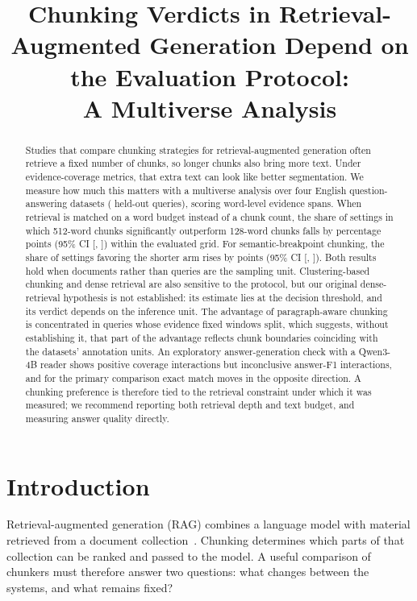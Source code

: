 \documentclass[11pt]{article}
\title{Chunking Verdicts in Retrieval-Augmented Generation Depend on the Evaluation Protocol:\texorpdfstring{\\}{ }A Multiverse Analysis}
\author{\AuthorName}
\date{}
\begin{document}
\maketitle

\begin{abstract}
Studies that compare chunking strategies for retrieval-augmented generation often retrieve a fixed number of chunks, so longer chunks also bring more text. Under evidence-coverage metrics, that extra text can look like better segmentation. We measure how much this matters with a multiverse analysis over four English question-answering datasets (\EoneNq{} held-out queries), scoring word-level evidence spans. When retrieval is matched on a word budget instead of a chunk count, the share of settings in which 512-word chunks significantly outperform 128-word chunks falls by \HOneEst{} percentage points (95\% CI [\HOneLo, \HOneHi]) within the evaluated grid. For semantic-breakpoint chunking, the share of settings favoring the shorter arm rises by \HFourEst{} points (95\% CI [\HFourLo, \HFourHi]). Both results hold when documents rather than queries are the sampling unit. Clustering-based chunking and dense retrieval are also sensitive to the protocol, but our original dense-retrieval hypothesis is not established: its estimate lies at the decision threshold, and its verdict depends on the inference unit. The advantage of paragraph-aware chunking is concentrated in queries whose evidence fixed windows split, which suggests, without establishing it, that part of the advantage reflects chunk boundaries coinciding with the datasets' annotation units. An exploratory answer-generation check with a Qwen3-4B reader shows positive coverage interactions but inconclusive answer-F1 interactions, and for the primary comparison exact match moves in the opposite direction. A chunking preference is therefore tied to the retrieval constraint under which it was measured; we recommend reporting both retrieval depth and text budget, and measuring answer quality directly.
\end{abstract}

\section{Introduction}
Retrieval-augmented generation (RAG) combines a language model with material retrieved from a document collection~\cite{lewis2020rag,gao2023ragsurvey}. Chunking determines which parts of that collection can be ranked and passed to the model. A useful comparison of chunkers must therefore answer two questions: what changes between the systems, and what remains fixed?
\end{document}
